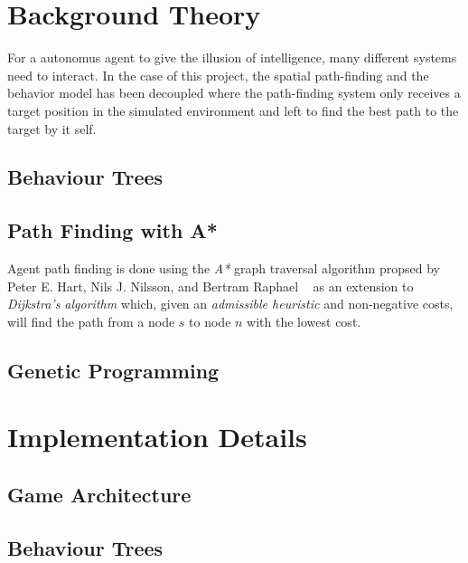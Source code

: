 \documentclass[a4paper, twocolumn]{article}
\begin{document}
    \section{Background Theory} \label{sec:background_theory}

	For a autonomus agent to give the illusion of intelligence, many different systems need to interact. In the case of this project, the spatial path-finding and the behavior model has been decoupled where the path-finding system only receives a target position in the simulated environment and left to find the best path to the target by it self.

        \subsection{Behaviour Trees} \label{sec:behaviour_trees}



        \subsection{Path Finding with A*} \label{sec:path_finding}

	Agent path finding is done using the \emph{A*} graph traversal algorithm propsed by Peter E. Hart, Nils J. Nilsson, and Bertram Raphael ~\cite{hart1968formal} as an extension to \emph{Dijkstra's algorithm} which, given an \emph{admissible heuristic} and non-negative costs, will find the path from a node \(s\) to node \(n\) with the lowest cost.
	

        \subsection{Genetic Programming} \label{sec:genetic_programming}



    \section{Implementation Details} \label{sec:implementation_details}



        \subsection{Game Architecture} \label{sec:game_architecture}



        \subsection{Behaviour Trees} \label{sec:behaviour_trees_implementation}
\end{document}
